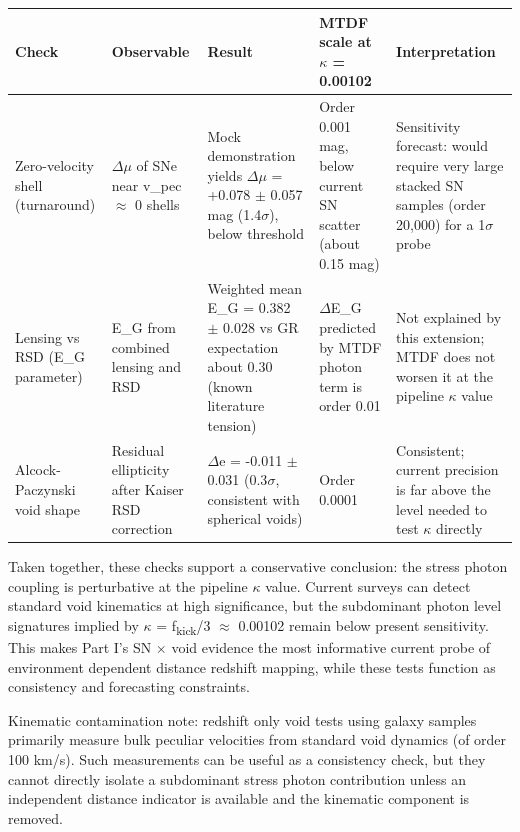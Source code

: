\documentclass[11pt,a4paper]{article}
\begin{document}
\begin{table}[H]
\centering
\footnotesize
\begin{tabularx}{\linewidth}{l>{\RaggedRight\arraybackslash}X>{\RaggedRight\arraybackslash}X>{\RaggedRight\arraybackslash}X>{\RaggedRight\arraybackslash}X}
\toprule
\textbf{Check} & \textbf{Observable} & \textbf{Result} & \textbf{MTDF scale at $\kappa$ = 0.00102} & \textbf{Interpretation} \tabularnewline
\midrule
Zero-velocity shell (turnaround) & $\Delta$$\mu$ of SNe near v\_\allowbreak{}pec $\approx$ 0 shells & Mock demonstration yields $\Delta$$\mu$ = +0.078 $\pm$ 0.057 mag (1.4$\sigma$), below threshold & Order 0.001 mag, below current SN scatter (about 0.15 mag) & Sensitivity forecast: would require very large stacked SN samples (order 20,000) for a 1$\sigma$ probe \tabularnewline
Lensing vs RSD (E\_\allowbreak{}G parameter) & E\_\allowbreak{}G from combined lensing and RSD & Weighted mean E\_\allowbreak{}G = 0.382 $\pm$ 0.028 vs GR expectation about 0.30 (known literature tension) & $\Delta$E\_\allowbreak{}G predicted by MTDF photon term is order 0.01 & Not explained by this extension; MTDF does not worsen it at the pipeline $\kappa$ value \tabularnewline
Alcock-Paczynski void shape & Residual ellipticity after Kaiser RSD correction & $\Delta$e = -0.011 $\pm$ 0.031 (0.3$\sigma$, consistent with spherical voids) & Order 0.0001 & Consistent; current precision is far above the level needed to test $\kappa$ directly \tabularnewline
\bottomrule
\end{tabularx}
\end{table}

Taken together, these checks support a conservative conclusion: the stress photon coupling is perturbative at the pipeline $\kappa$ value. Current surveys can detect standard void kinematics at high significance, but the subdominant photon level signatures implied by $\kappa$ = f\textsubscript{kick}/3 $\approx$ 0.00102 remain below present sensitivity. This makes Part I's SN $\times$ void evidence the most informative current probe of environment dependent distance redshift mapping, while these tests function as consistency and forecasting constraints.

Kinematic contamination note: redshift only void tests using galaxy samples primarily measure bulk peculiar velocities from standard void dynamics (of order 100 km/\allowbreak{}s). Such measurements can be useful as a consistency check, but they cannot directly isolate a subdominant stress photon contribution unless an independent distance indicator is available and the kinematic component is removed.
\end{document}
